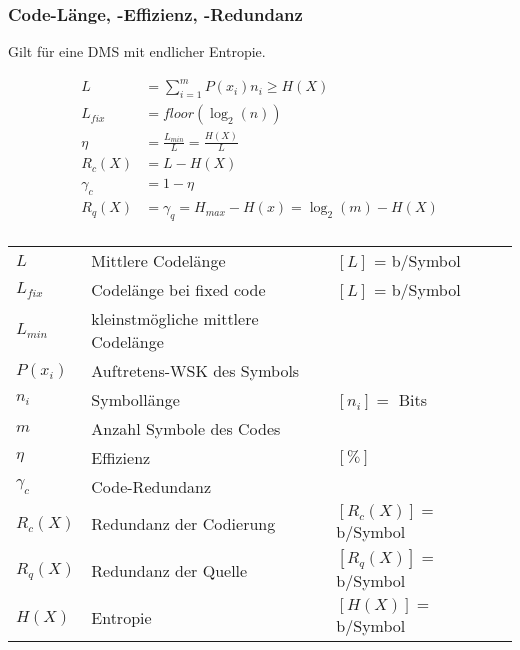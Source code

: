 \subsubsection{Code-Länge, -Effizienz, -Redundanz }
Gilt für eine DMS mit endlicher Entropie.
\begin{multicols}{2}
	\abovedisplayskip=-15pt %
	\begin{align*}
		L 		 &= \sum\limits_{i=1}^m P(x_i) n_i \geq H(X)\\
		L_{fix}	 &= floor(\log_2(n))\\
		\eta	 & = \frac{L_{min}}{L} = \frac{H(X)}{L}  \\
		R_c(X) &  = L - H(X) \\
		\gamma_c &  = 1-\eta \\
		R_q(X)	 &= \gamma_q = H_{max} - H(x) = \log_2(m) - H(X) \\
	\end{align*}
	
	\begin{tabular}{lll}
		$L$ 		& Mittlere Codelänge & $[L]$ = b/Symbol \\
		$L_{fix}$	& Codelänge bei fixed code	& $[L]$ = b/Symbol \\
		$L_{min}$ 	& kleinstmögliche mittlere Codelänge &  \\
		$P(x_i)$	& Auftretens-WSK des Symbols \\
		$n_i$ 		& Symbollänge & $[n_i] = $ Bits \\
		$m$ 		& Anzahl Symbole des Codes \\
		$\eta$ 		& Effizienz & $[\%]$\\
		$\gamma_c$  & Code-Redundanz  & \\
		$R_c(X)$    & Redundanz der Codierung & $[R_c(X)] = $ b/Symbol\\
		$R_q(X)$    & Redundanz der Quelle & $[R_q(X)] = $ b/Symbol\\
		$H(X)$ 		& Entropie &  $[H(X)] = $ b/Symbol
	\end{tabular}
\end{multicols}

